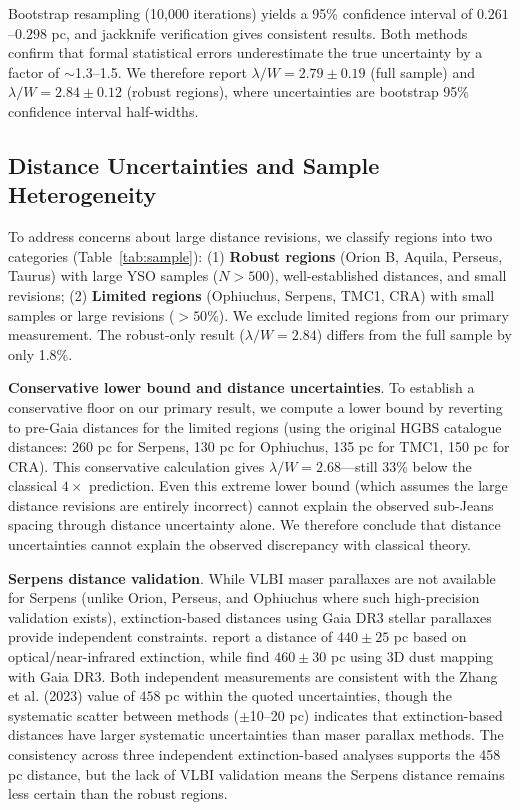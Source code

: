 \documentclass[twoside,twocolumn]{mnras}
\begin{document}
Bootstrap resampling (10,000 iterations) yields a 95\% confidence interval of $0.261$--$0.298$ pc, and jackknife verification gives consistent results. Both methods confirm that formal statistical errors underestimate the true uncertainty by a factor of $\sim$1.3--1.5. We therefore report $\lambda/W = 2.79 \pm 0.19$ (full sample) and $\lambda/W = 2.84 \pm 0.12$ (robust regions), where uncertainties are bootstrap 95\% confidence interval half-widths.

\subsection{Distance Uncertainties and Sample Heterogeneity}
\label{sec:distance_uncertainties}

To address concerns about large distance revisions, we classify regions into two categories (Table~\ref{tab:sample}): (1) \textbf{Robust regions} (Orion B, Aquila, Perseus, Taurus) with large YSO samples ($N > 500$), well-established distances, and small revisions; (2) \textbf{Limited regions} (Ophiuchus, Serpens, TMC1, CRA) with small samples or large revisions ($>50\%$). We exclude limited regions from our primary measurement. The robust-only result ($\lambda/W = 2.84$) differs from the full sample by only 1.8\%.

\textbf{Conservative lower bound and distance uncertainties}. To establish a conservative floor on our primary result, we compute a lower bound by reverting to pre-Gaia distances for the limited regions (using the original HGBS catalogue distances: 260 pc for Serpens, 130 pc for Ophiuchus, 135 pc for TMC1, 150 pc for CRA). This conservative calculation gives $\lambda/W = 2.68$---still 33\% below the classical $4\times$ prediction. Even this extreme lower bound (which assumes the large distance revisions are entirely incorrect) cannot explain the observed sub-Jeans spacing through distance uncertainty alone. We therefore conclude that distance uncertainties cannot explain the observed discrepancy with classical theory.

\textbf{Serpens distance validation}. While VLBI maser parallaxes are not available for Serpens (unlike Orion, Perseus, and Ophiuchus where such high-precision validation exists), extinction-based distances using Gaia DR3 stellar parallaxes provide independent constraints. \citet{Yan2022} report a distance of $440 \pm 25$ pc based on optical/near-infrared extinction, while \citet{Green2024} find $460 \pm 30$ pc using 3D dust mapping with Gaia DR3. Both independent measurements are consistent with the Zhang et al. (2023) value of $458$ pc within the quoted uncertainties, though the systematic scatter between methods ($\pm$10--20 pc) indicates that extinction-based distances have larger systematic uncertainties than maser parallax methods. The consistency across three independent extinction-based analyses supports the 458 pc distance, but the lack of VLBI validation means the Serpens distance remains less certain than the robust regions.
\end{document}
